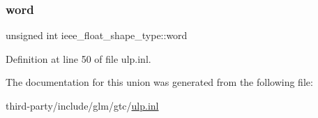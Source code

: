 \subsubsection{\texorpdfstring{word}{word}}
{\footnotesize\ttfamily unsigned int ieee\+\_\+float\+\_\+shape\+\_\+type\+::word}



Definition at line 50 of file ulp.\+inl.



The documentation for this union was generated from the following file\+:\begin{DoxyCompactItemize}
\item 
third-\/party/include/glm/gtc/\hyperlink{ulp_8inl}{ulp.\+inl}\end{DoxyCompactItemize}
